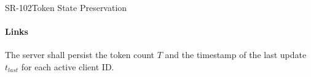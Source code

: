 \begin{softwarerequirement}{SR-102}{Token State Preservation}
\paragraph{Links} 

The server shall persist the token count $T$ and the timestamp of the last update $t_{last}$ for each active client ID\@.
\end{softwarerequirement}